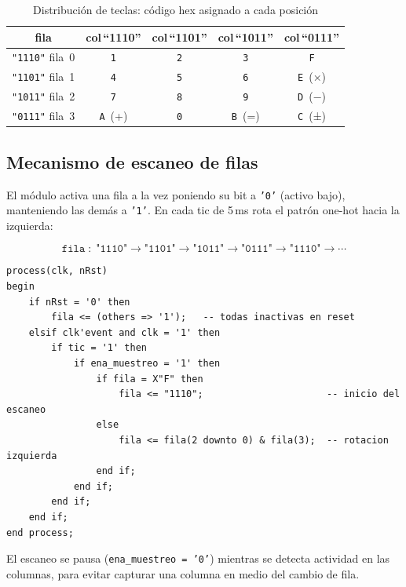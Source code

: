 \documentclass[memoria_final]{subfiles}
\begin{document}
\begin{table}[H]
  \centering
  \caption{Distribución de teclas: código hex asignado a cada posición}
  \begin{tabular}{ccccc}
    \toprule
    \textbf{fila} & \textbf{col\,``1110''} & \textbf{col\,``1101''} &
    \textbf{col\,``1011''} & \textbf{col\,``0111''} \\
    \midrule
    \texttt{"1110"} fila~0 & \texttt{1} & \texttt{2} & \texttt{3} & \texttt{F} \\
    \texttt{"1101"} fila~1 & \texttt{4} & \texttt{5} & \texttt{6} & \texttt{E}~(×) \\
    \texttt{"1011"} fila~2 & \texttt{7} & \texttt{8} & \texttt{9} & \texttt{D}~(−) \\
    \texttt{"0111"} fila~3 & \texttt{A}~(+) & \texttt{0} & \texttt{B}~(=) & \texttt{C}~(±) \\
    \bottomrule
  \end{tabular}
\end{table}

\subsection{Mecanismo de escaneo de filas}

El módulo activa una fila a la vez poniendo su bit a \texttt{'0'} (activo bajo),
manteniendo las demás a \texttt{'1'}. En cada tic de 5\,ms rota el patrón
one-hot hacia la izquierda:

$$\texttt{fila} \;:\; \texttt{"1110"} \to \texttt{"1101"} \to \texttt{"1011"} \to \texttt{"0111"} \to \texttt{"1110"} \to \cdots$$

\begin{lstlisting}[caption={Rotación one-hot de filas en \texttt{ctrl\_tec.vhd}}]
process(clk, nRst)
begin
    if nRst = '0' then
        fila <= (others => '1');   -- todas inactivas en reset
    elsif clk'event and clk = '1' then
        if tic = '1' then
            if ena_muestreo = '1' then
                if fila = X"F" then
                    fila <= "1110";                      -- inicio del escaneo
                else
                    fila <= fila(2 downto 0) & fila(3);  -- rotacion izquierda
                end if;
            end if;
        end if;
    end if;
end process;
\end{lstlisting}

El escaneo se pausa (\texttt{ena\_muestreo = '0'}) mientras se detecta
actividad en las columnas, para evitar capturar una columna en medio del
cambio de fila.
\end{document}
